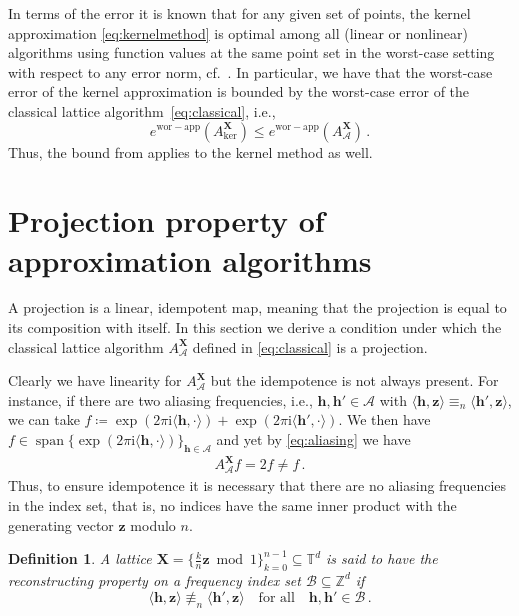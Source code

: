 \documentclass[a4paper]{amsart}
\newtheorem{definition}[theorem]{Definition}
\DeclareMathOperator{\Span}{span}
\newcommand{\ewc}{e^{\mathrm{wor-app}}}
\newcommand{\modone}{\bmod{}1}
\begin{document}
In terms of the error it is known that for any given set of points, the kernel approximation \eqref{eq:kernelmethod} is optimal among all (linear or nonlinear) algorithms using function values at the same point set in the worst-case setting with respect to any error norm, cf.\ \cite{KKKNS21}.
In particular, we have that the worst-case error of the kernel approximation is bounded by the worst-case error of the classical lattice algorithm~\eqref{eq:classical}, i.e.,
\begin{equation*}
    \ewc(A_{\text{ker}}^{\bm X})
    \le \ewc(A_{\mathcal A}^{\bm X}) \,.
\end{equation*}
Thus, the bound from  applies to the kernel method as well.

 \section{Projection property of approximation algorithms}\label{sec:proj} 

A projection is a linear, idempotent map, meaning that the projection is equal to its composition with itself.
In this section we derive a condition under which the classical lattice algorithm $A_{\mathcal A}^{\bm X}$ defined in \eqref{eq:classical} is a projection.

Clearly we have linearity for $A_{\mathcal A}^{\bm X}$ but the idempotence is not always present.
For instance, if there are two aliasing frequencies, i.e., $\bm h,\bm h'\in\mathcal A$ with $\langle\bm h,\bm z\rangle \equiv_n \langle\bm h',\bm z\rangle$, we can take $f \coloneqq \exp(2\pi\mathrm i \langle \bm h, \cdot\rangle) + \exp(2\pi\mathrm i \langle \bm h', \cdot\rangle)$.
We then have $f\in \Span\{\exp(2\pi\mathrm i\langle\bm h,\cdot\rangle)\}_{\bm h\in\mathcal A}$ and yet by \eqref{eq:aliasing} we have
\begin{align*}
    A_{\mathcal A}^{\bm X} f
    = 2 f
    \neq f \,.
\end{align*}
Thus, to ensure idempotence it is necessary that there are no aliasing frequencies in the index set, that is, no indices have the same inner product with the generating vector $\bm z$ modulo $n$.

\begin{definition} A lattice $\bm X = \{\tfrac kn\bm z\modone\}_{k=0}^{n-1}\subseteq\mathds T^d$ is said to have the \emph{reconstructing property} on a frequency index set $\mathcal B\subseteq\mathds Z^d$ if 
    \begin{equation}\label{eq:recon}
        \langle\bm h,\bm z\rangle
        \not\equiv_n \langle\bm h',\bm z\rangle
        \quad\text{for all}\quad
        \bm h,\bm h'\in \mathcal B \,.
    \end{equation}
\end{definition} 
\end{document}
